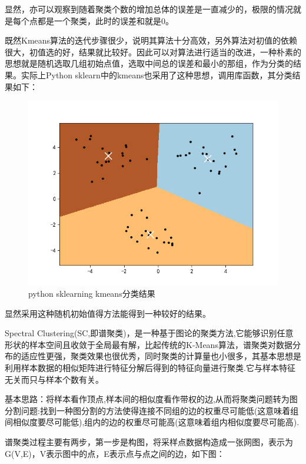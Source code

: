 \documentclass{article}
\newcommand{\hs}{\hspace{2em}}
\begin{document}
显然，亦可以观察到随着聚类个数的增加总体的误差是一直减少的，极限的情况就是每个点都是一个聚类，此时的误差和就是0。


{}

既然Kmeans算法的迭代步骤很少，说明其算法十分高效，另外算法对初值的依赖很大，初值选的好，结果就比较好。因此可以对算法进行适当的改进，一种朴素的思想就是随机选取几组初始点值，选取中间总的误差和最小的那组，作为分类的结果。实际上Python sklearn中的kmeans也采用了这种思想，调用库函数，其分类结果如下：

\begin{figure}[htbp]
	\centering
	\includegraphics[width=0.7\linewidth]{img//fig7.png}
	\caption{python sklearning kmeans分类结果}
\end{figure}	

\hs 显然采用这种随机初始值得方法能得到一种较好的结果。\\[-0.3cm]


{}

\hs Spectral Clustering(SC,即谱聚类)，是一种基于图论的聚类方法,它能够识别任意形状的样本空间且收敛于全局最有解，比起传统的K-Means算法，谱聚类对数据分布的适应性更强，聚类效果也很优秀，同时聚类的计算量也小很多，其基本思想是利用样本数据的相似矩阵进行特征分解后得到的特征向量进行聚类.它与样本特征无关而只与样本个数有关。

\hs 基本思路：将样本看作顶点,样本间的相似度看作带权的边,从而将聚类问题转为图分割问题:找到一种图分割的方法使得连接不同组的边的权重尽可能低(这意味着组间相似度要尽可能低),组内的边的权重尽可能高(这意味着组内相似度要尽可能高).

\hs 谱聚类过程主要有两步，第一步是构图，将采样点数据构造成一张网图，表示为G(V,E)，V表示图中的点，E表示点与点之间的边，如下图： 
\end{document}

